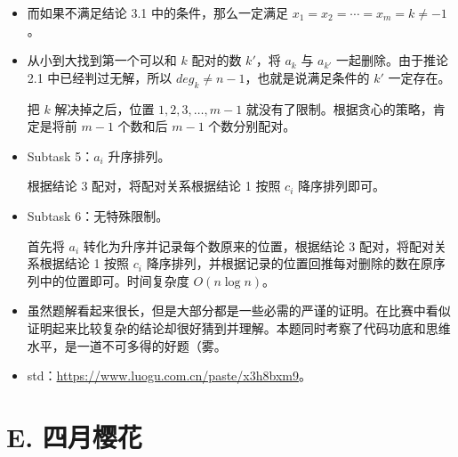 \documentclass[10pt,aspectratio=43,mathserif]{beamer}
\begin{document}
\begin{frame}

	\begin{itemize} \setlength{\parskip}{0.4\baselineskip}

		\item 而如果不满足结论 3.1 中的条件，那么一定满足 $x_1=x_2=\cdots=x_m=k\neq -1$。

		\item 从小到大找到第一个可以和 $k$ 配对的数 $k'$，将 $a_k$ 与 $a_{k'}$ 一起删除。由于推论 2.1 中已经判过无解，所以 $deg_k\neq n-1$，也就是说满足条件的 $k'$ 一定存在。

		把 $k$ 解决掉之后，位置 $1,2,3,\dots,m-1$ 就没有了限制。根据贪心的策略，肯定是将前 $m-1$ 个数和后 $m-1$ 个数分别配对。

	\end{itemize}

\end{frame}

\begin{frame}

	\begin{itemize} \setlength{\parskip}{0.4\baselineskip}

		\item Subtask 5：$a_i$ 升序排列。

		根据结论 3 配对，将配对关系根据结论 1 按照 $c_i$ 降序排列即可。

		\item Subtask 6：无特殊限制。

		首先将 $a_i$ 转化为升序并记录每个数原来的位置，根据结论 3 配对，将配对关系根据结论 1 按照 $c_i$ 降序排列，并根据记录的位置回推每对删除的数在原序列中的位置即可。时间复杂度 $O(n\log n)$。

		\item 虽然题解看起来很长，但是大部分都是一些必需的严谨的证明。在比赛中看似证明起来比较复杂的结论却很好猜到并理解。本题同时考察了代码功底和思维水平，是一道不可多得的好题（雾。

		\item std：\url{https://www.luogu.com.cn/paste/x3h8bxm9}。

	\end{itemize}


\end{frame}\section{E. 四月樱花}
\end{document}
